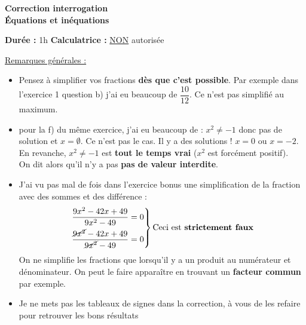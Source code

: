 \documentclass[12pt,a4paper]{exam}
\begin{document}
\begin{center}
    \Large\textbf{Correction interrogation\\Équations et inéquations}
\end{center}

\vspace{0.3cm}

\noindent
\textbf{Durée :} 1h \hfill
\textbf{Calculatrice :} \underline{NON} autorisée

\vspace{0.5cm}


\underline{Remarques générales :}
\vspace{5pt}
{\color{red}
\begin{itemize}
    \item Pensez à simplifier vos fractions \textbf{dès que c'est possible}. Par exemple dans 
l'exercice 1 question b) j'ai eu beaucoup de $\dfrac{10}{12}$. Ce 
n'est pas simplifié au maximum.
\vspace{5pt}
    \item pour la f) du même exercice, j'ai eu beaucoup de : $x^2 \neq -1$ donc pas de solution 
    et $x = \emptyset$. Ce n'est pas le cas. Il y a des solutions ! $x = 0$ ou $x = -2$. En 
    revanche, $x^2 \neq -1$ est \textbf{tout le temps vrai} ($x^2$ est forcément positif).
    \\On dit alors qu'il n'y a pas \textbf{pas de valeur interdite}.
    \vspace{5pt}
    \item J'ai vu pas mal de fois dans l'exercice bonus une simplification de la fraction avec 
    des sommes et des différence : 
    \[
        \left.
        \begin{aligned}
        \dfrac{9x^2-42x+49}{9x^2-49} = 0 & \\
        \dfrac{\cancel{9x^2}-42x+49}{\cancel{9x^2}-49} = 0
        \end{aligned}
        \right\}
        \text{Ceci est \textbf{strictement faux}}
    \]
    On ne simplifie les fractions que lorsqu'il y a un produit
    au numérateur et dénominateur. On peut le faire apparaître en trouvant un \textbf{facteur commun}
    par exemple.
    \vspace{5pt}
    \item Je ne mets pas les tableaux de signes dans la correction, à vous de les refaire pour retrouver 
    les bons résultats
\end{itemize}
}
\end{document}
